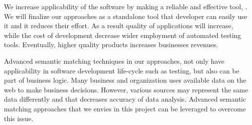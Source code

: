 \noindent
We increase applicability of the software by making a reliable and effective \testreuse tool, \toolreuse. 
We will finalize our approaches as a standalone tool that developer can easily use it and it reduces their effort.
As a result quality of applications will increase, while the cost of development decrease wider employment of automated testing tools.
Eventually, higher quality products increases businesses revenues.

Advanced semantic matching techniques in our \testreuse approaches, not only have applicability in software development life-cycle such as testing, but also can be part of business logic. 
Many business and organization uses available data on the web to make business decisions. 
However, various sources may represent the same data differently and that decreases accuracy of data analysis.
Advanced semantic matching approaches that we envies in this project can be leveraged to overcome this issue.
